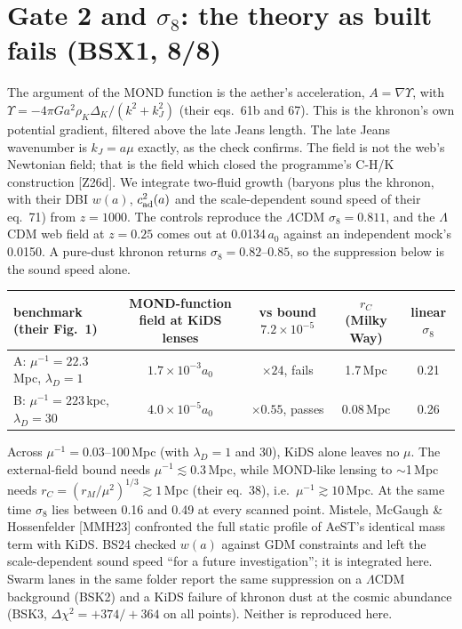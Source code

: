 \documentclass[10pt]{article}
\begin{document}
\section{Gate 2 and $\sigma_8$: the theory as built fails (BSX1, 8/8)}
The argument of the MOND function is the aether's acceleration, $A=\nabla\Upsilon$, with $\Upsilon=-4\pi Ga^2\rho_K\Delta_K/(k^2+k_J^2)$ (their eqs.~61b and 67). This is the khronon's own potential gradient, filtered above the late Jeans length. The late Jeans wavenumber is $k_J=a\mu$ exactly, as the check confirms. The field is not the web's Newtonian field; that is the field which closed the programme's C-H/K construction [Z26d].
We integrate two-fluid growth (baryons plus the khronon, with their DBI $w(a)$, $c_{\rm ad}^2(a)$ and the scale-dependent sound speed of their eq.~71) from $z=1000$.
The controls reproduce the $\Lambda$CDM $\sigma_8=0.811$, and the $\Lambda$CDM web field at $z=0.25$ comes out at 0.0134\,$a_0$ against an independent mock's 0.0150. A pure-dust khronon returns $\sigma_8=0.82$--$0.85$, so the suppression below is the sound speed alone.

\smallskip
{\footnotesize\centering
\begin{tabular}{@{}lcccc@{}}
\toprule
benchmark (their Fig.~1) & MOND-function field at KiDS lenses & vs bound $7.2\times10^{-5}$ & $r_C$ (Milky Way) & linear $\sigma_8$\\
\midrule
A: $\mu^{-1}=22.3$\,Mpc, $\lambda_D=1$ & $1.7\times10^{-3}a_0$ & $\times24$, fails & 1.7\,Mpc & 0.21\\
B: $\mu^{-1}=223$\,kpc, $\lambda_D=30$ & $4.0\times10^{-5}a_0$ & $\times0.55$, passes & 0.08\,Mpc & 0.26\\
\bottomrule
\end{tabular}\par}
\smallskip
Across $\mu^{-1}=0.03$--100\,Mpc (with $\lambda_D=1$ and 30), KiDS alone leaves no $\mu$. The external-field bound needs $\mu^{-1}\lesssim0.3$\,Mpc, while MOND-like lensing to $\sim$1\,Mpc needs $r_C=(r_M/\mu^2)^{1/3}\gtrsim1$\,Mpc (their eq.~38), i.e.\ $\mu^{-1}\gtrsim10$\,Mpc. At the same time $\sigma_8$ lies between 0.16 and 0.49 at every scanned point.
Mistele, McGaugh \& Hossenfelder [MMH23] confronted the full static profile of AeST's identical mass term with KiDS. BS24 checked $w(a)$ against GDM constraints and left the scale-dependent sound speed ``for a future investigation''; it is integrated here.
Swarm lanes in the same folder report the same suppression on a $\Lambda$CDM background (BSK2) and a KiDS failure of khronon dust at the cosmic abundance (BSK3, $\Delta\chi^2=+374/+364$ on all points). Neither is reproduced here.
\end{document}
